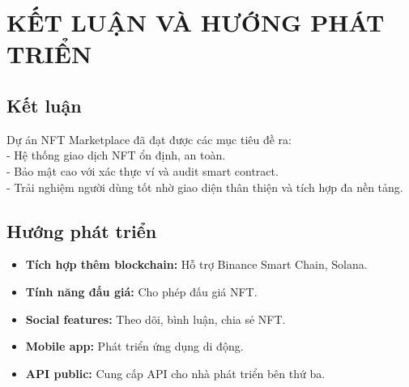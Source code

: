 \chapter{KẾT LUẬN VÀ HƯỚNG PHÁT TRIỂN}

\section{Kết luận}
Dự án NFT Marketplace đã đạt được các mục tiêu đề ra: \\
- Hệ thống giao dịch NFT ổn định, an toàn. \\
- Bảo mật cao với xác thực ví và audit smart contract. \\
- Trải nghiệm người dùng tốt nhờ giao diện thân thiện và tích hợp đa nền tảng.

\section{Hướng phát triển}
\begin{itemize}
    \item \textbf{Tích hợp thêm blockchain:} Hỗ trợ Binance Smart Chain, Solana.
    \item \textbf{Tính năng đấu giá:} Cho phép đấu giá NFT.
    \item \textbf{Social features:} Theo dõi, bình luận, chia sẻ NFT.
    \item \textbf{Mobile app:} Phát triển ứng dụng di động.
    \item \textbf{API public:} Cung cấp API cho nhà phát triển bên thứ ba.
\end{itemize} 